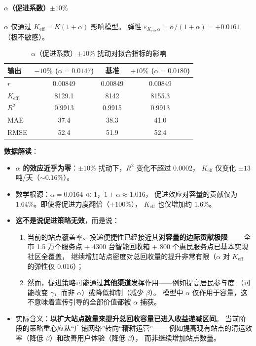 \documentclass[12pt,a4paper]{ctexart}
\begin{document}
\paragraph{$\alpha$（促进系数）$\pm 10\%$}

$\alpha$ 仅通过 $K_{\text{eff}} = K(1+\alpha)$ 影响模型。
弹性 $\varepsilon_{K_{\text{eff}},\alpha} = \alpha/(1+\alpha) = +0.0161$（极不敏感）。

\begin{table}[htbp]
\centering
\caption{$\alpha$（促进系数）$\pm 10\%$ 扰动对拟合指标的影响}
\label{tab:sens_alpha}
\begin{tabular}{lccc}
\toprule
输出 & $-10\%$ ($\alpha = 0.0147$) & 基准 & $+10\%$ ($\alpha = 0.0180$) \\
\midrule
$r$      & 0.00849 & 0.00849 & 0.00849 \\
$K_{\text{eff}}$ & 8129.1 & 8142 & 8155.3 \\
$R^2$    & 0.9913 & 0.9915 & 0.9913 \\
MAE      & 37.4 & 38.3 & 41.0 \\
RMSE     & 52.4 & 51.9 & 52.4 \\
\bottomrule
\end{tabular}
\end{table}

\textbf{数据解读}：
\begin{itemize}
  \item \textbf{$\alpha$ 的效应近乎为零}：$\pm 10\%$ 扰动下，$R^2$ 变化不超过 $0.0002$，
        $K_{\text{eff}}$ 仅变化 $\pm 13$ 吨/天（$\sim 0.16\%$）。
  \item 数学根源：$\alpha = 0.0164 \ll 1$，$1+\alpha \approx 1.016$，
        促进效应对容量的贡献仅为 $1.64\%$。即使将促进力度翻倍（$+100\%$），
        $K_{\text{eff}}$ 也仅增加约 $1.6\%$。
  \item \textbf{这不是说促进策略无效}，而是说：
        \begin{enumerate}
          \item 当前的站点覆盖率、投递便捷性已经接近其\textbf{对容量的边际贡献极限}——
                全市 1.5 万个服务点 + 4300 台智能回收箱 + 800 个惠民服务点已基本实现社区全覆盖，
                继续增加站点密度对总回收量的提升非常有限（$\alpha$ 对 $K_{\text{eff}}$ 的弹性仅 0.016）；
          \item 然而，促进策略可能通过\textbf{其他渠道}发挥作用——例如提高居民参与度
                （可能改变 $\gamma$，而非 $\alpha$）或降低抑制（减少 $\beta$）。
                模型中 $\alpha$ 仅作用于容量，这不意味着宣传引导的全部价值都被 $\alpha$ 捕获。
        \end{enumerate}
  \item 实际含义：\textbf{以扩大站点数量来提升总回收容量已进入收益递减区间}。
        当前阶段的策略重心应从``广铺网络''转向``精耕运营''——
        例如提高现有站点的清运效率（降低 $\beta$）和改善用户体验（降低 $\beta$），
        而非继续增加站点数量。
\end{itemize}
\end{document}
